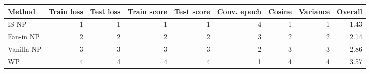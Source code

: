 \begin{tabular}{lrrrrrrrr}
\toprule
Method & Train loss & Test loss & Train score & Test score & Conv. epoch & Cosine & Variance & Overall \\
\midrule
IS-NP & 1 & 1 & 1 & 1 & 4 & 1 & 1 & 1.43 \\
Fan-in NP & 2 & 2 & 2 & 2 & 3 & 2 & 2 & 2.14 \\
Vanilla NP & 3 & 3 & 3 & 3 & 2 & 3 & 3 & 2.86 \\
WP & 4 & 4 & 4 & 4 & 1 & 4 & 4 & 3.57 \\
\bottomrule
\end{tabular}
